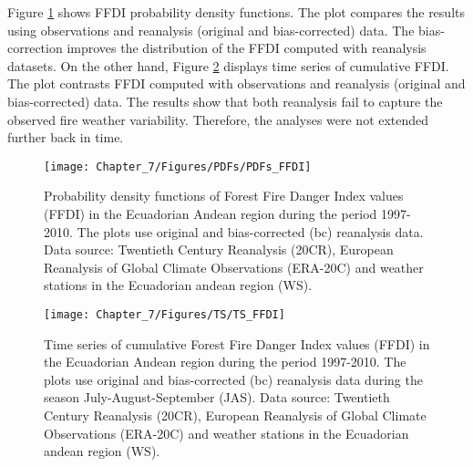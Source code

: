 Figure \ref{fig:Probability density functions of Forest Fire Danger Index values in the Ecuadorian andean region during the period 1997-2010}
shows FFDI probability density functions. The plot compares the results
using observations and reanalysis (original and bias-corrected) data.
The bias-correction improves the distribution of the FFDI computed
with reanalysis datasets. On the other hand, Figure \ref{fig:Time series of cumulative Forest Fire Danger Index values in the Ecuadorian andean region during the period 1997-2010}
displays time series of cumulative FFDI. The plot contrasts FFDI computed
with observations and reanalysis (original and bias-corrected) data.
The results show that both reanalysis fail to capture the observed
fire weather variability. Therefore, the analyses were not extended
further back in time. 

\begin{figure}[h]
\noindent \begin{centering}
\texttt{[image: Chapter\_7/Figures/PDFs/PDFs\_FFDI]}
\par\end{centering}

\caption[Probability density functions of Forest Fire Danger Index values (FFDI)
in the Ecuadorian Andean region during the period 1997-2010]{Probability density functions of Forest Fire Danger Index values (FFDI)
in the Ecuadorian Andean region during the period 1997-2010. The plots
use original and bias-corrected (bc) reanalysis data. Data source:
Twentieth Century Reanalysis (20CR), European Reanalysis of Global
Climate Observations (ERA-20C) and weather stations in the Ecuadorian
andean region (WS). \label{fig:Probability density functions of Forest Fire Danger Index values in the Ecuadorian andean region during the period 1997-2010}}
\end{figure}


\begin{figure}[h]
\noindent \begin{centering}
\texttt{[image: Chapter\_7/Figures/TS/TS\_FFDI]}
\par\end{centering}

\caption[Time series of cumulative Forest Fire Danger Index values (FFDI) in
the Ecuadorian Andean region during the period 1997-2010]{Time series of cumulative Forest Fire Danger Index values (FFDI) in
the Ecuadorian Andean region during the period 1997-2010. The plots
use original and bias-corrected (bc) reanalysis data during the season
July-August-September (JAS). Data source: Twentieth Century Reanalysis
(20CR), European Reanalysis of Global Climate Observations (ERA-20C)
and weather stations in the Ecuadorian andean region (WS). \label{fig:Time series of cumulative Forest Fire Danger Index values in the Ecuadorian andean region during the period 1997-2010}}
\end{figure}




